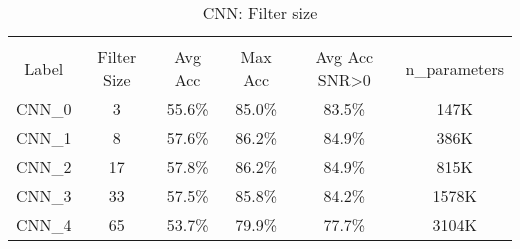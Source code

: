 \chapter{} \label{Appendix_B}


\begin{table}[h!]
\centering
\begin{tabular}{| c  c  c  c  c  c |} 
 \hline \\[-1em]
 Label & Filter Size & Avg Acc & Max Acc & Avg Acc SNR>0 & n\_parameters \\ [1ex]
    CNN\_0 & 3 & 55.6\% & 85.0\% & 83.5\% & 147K \\ [1ex]
    CNN\_1 & 8 & 57.6\% & 86.2\% & 84.9\% & 386K \\ [1ex]
    CNN\_2 & 17 & 57.8\% & 86.2\% & 84.9\% & 815K \\ [1ex]
    CNN\_3 & 33 & 57.5\% & 85.8\% & 84.2\% & 1578K \\ [1ex]
    CNN\_4 & 65 & 53.7\% & 79.9\% & 77.7\% & 3104K \\ [1ex]
 \hline
\end{tabular}
\caption{CNN: Filter size}
\label{table:cnn_filter_size}
\end{table}

